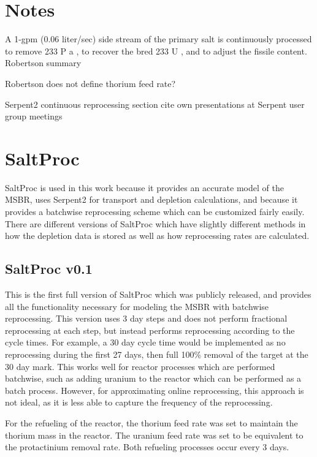 
\section{Notes}

A 1-gpm
(0.06 liter/sec) side stream of the primary salt is
continuously processed to remove
 233 P a , to recover the
bred
 233 U , and to adjust the fissile content. Robertson summary
 
 Robertson does not define thorium feed rate?
 
 Serpent2 continuous reprocessing section cite own presentations at Serpent user group meetings

\section{SaltProc}

SaltProc is used in this work because it provides an accurate model of the MSBR, uses Serpent2 for transport and depletion calculations, and because it provides a batchwise reprocessing scheme which can be customized fairly easily. There are different versions of SaltProc which have slightly different methods in how the depletion data is stored as well as how reprocessing rates are calculated.

\subsection{SaltProc v0.1}

This is the first full version of SaltProc which was publicly released, and provides all the functionality necessary for modeling the MSBR with batchwise reprocessing. This version uses 3 day steps and does not perform fractional reprocessing at each step, but instead performs reprocessing according to the cycle times. For example, a 30 day cycle time would be implemented as no reprocessing during the first 27 days, then full 100\% removal of the target at the 30 day mark. This works well for reactor processes which are performed batchwise, such as adding uranium to the reactor which can be performed as a batch process. However, for approximating online reprocessing, this approach is not ideal, as it is less able to capture the frequency of the reprocessing.

For the refueling of the reactor, the thorium feed rate was set to maintain the thorium mass in the reactor. The uranium feed rate was set to be equivalent to the protactinium removal rate. Both refueling processes occur every 3 days. 

